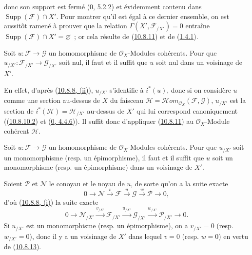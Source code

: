 
donc son support est fermé (\hyperref[0.5.2.2-fr]{0, 5.2.2}) et
évidemment contenu dans $\operatorname{Supp}(\mathscr{F})\cap X'$. Pour
montrer qu'il est égal à ce dernier ensemble, on est aussitôt ramené à
prouver que la relation $\Gamma(X',\mathscr{F}_{/X'})=0$ entraîne
$\operatorname{Supp}(\mathscr{F})\cap X'=\varnothing$~; or cela résulte de
(\hyperref[I.10.8.11-fr]{10.8.11}) et de
(\hyperref[I.1.4.1-fr]{1.4.1}).

\begin{corollary}[10.8.13]
\label{I.10.8.13-fr}
Soit $u:\mathscr{F}\to\mathscr{G}$ un homomorphisme de
$\mathscr{O}_X$-Modules cohérents. Pour que
$u_{/X'}:\mathscr{F}_{/X'}\to\mathscr{G}_{/X'}$ soit nul, il faut et il
suffit que $u$ soit nul dans un voisinage de $X'$.
\end{corollary}

En effet, d'après (\hyperref[I.10.8.8-fr]{10.8.8, (ii)}), $u_{/X'}$
s'identifie à $i^*(u)$, donc si on considère $u$ comme une section au-dessus
de $X$ du faisceau
$\mathscr{H}=\mathscr{H}\!om_{\mathscr{O}_X}(\mathscr{F},\mathscr{G})$,
$u_{/X'}$ est la section de
$i^*(\mathscr{H})=\mathscr{H}_{/X'}$ au-dessus de $X'$ qui lui correspond
canoniquement ((\hyperref[I.10.8.10.2-fr]{10.8.10.2}) et
(\hyperref[0.4.4.6-fr]{0, 4.4.6})). Il suffit donc d'appliquer
(\hyperref[I.10.8.11-fr]{10.8.11}) au $\mathscr{O}_X$-Module cohérent
$\mathscr{H}$.

\begin{corollary}[10.8.14]
\label{I.10.8.14-fr}
Soit $u:\mathscr{F}\to\mathscr{G}$ un homomorphisme de
$\mathscr{O}_X$-Modules cohérents. Pour que $u_{/X'}$ soit un monomorphisme
(resp. un épimorphisme), il faut et il suffit que $u$ soit un monomorphisme
(resp. un épimorphisme) dans un voisinage de $X'$.
\end{corollary}

Soient $\mathscr{P}$ et $\mathscr{N}$ le conoyau et le noyau de $u$, de
sorte qu'on a la suite exacte
\[
  0\to\mathscr{N}\xrightarrow{v}\mathscr{F}\xrightarrow{u}
  \mathscr{G}\xrightarrow{w}\mathscr{P}\to0,
\]
d'où (\hyperref[I.10.8.8-fr]{10.8.8, (i)}) la suite exacte
\[
  0\to\mathscr{N}_{/X'}\xrightarrow{v_{/X'}}
  \mathscr{F}_{/X'}\xrightarrow{u_{/X'}}
  \mathscr{G}_{/X'}\xrightarrow{w_{/X'}}
  \mathscr{P}_{/X'}\to0.
\]
Si $u_{/X'}$ est un monomorphisme (resp. un épimorphisme), on a
$v_{/X'}=0$ (resp. $w_{/X'}=0$), donc il y a un voisinage de $X'$ dans
lequel $v=0$ (resp. $w=0$) en vertu de
(\hyperref[I.10.8.13-fr]{10.8.13}).

